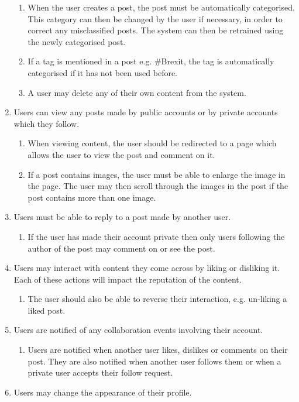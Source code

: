 \begin{enumerate}[label=\textbf{F\arabic*}]
\begin{enumerate}
			\item When the user creates a post, the post must be automatically categorised. This category can then be changed by the user if necessary, in order to correct any misclassified posts. The system can then be retrained using the newly categorised post.
			\item If a tag is mentioned in a post e.g. \#Brexit, the tag is automatically categorised if it has not been used before.
			\item A user may delete any of their own content from the system.
		\end{enumerate}
	\item Users can view any posts made by public accounts or by private accounts which they follow.
		\begin{enumerate}
			\item When viewing content, the user should be redirected to a page which allows the user to view the post and comment on it.
			\item If a post contains images, the user must be able to enlarge the image in the page. The user may then scroll through the images in the post if the post contains more than one image.
		\end{enumerate}
	\item Users must be able to reply to a post made by another user.
		\begin{enumerate}
			\item If the user has made their account private then only users following the author of the post may comment on or see the post.
		\end{enumerate}
	\item Users may interact with content they come across by liking or disliking it. Each of these actions will impact the reputation of the content.
		\begin{enumerate}
			\item The user should also be able to reverse their interaction, e.g. un-liking a liked post.
		\end{enumerate}
	\item Users are notified of any collaboration events involving their account.
		\begin{enumerate}
			\item Users are notified when another user likes, dislikes or comments on their post. They are also notified when another user follows them or when a private user accepts their follow request.
		\end{enumerate}
	\item Users may change the appearance of their profile.

\end{enumerate}
